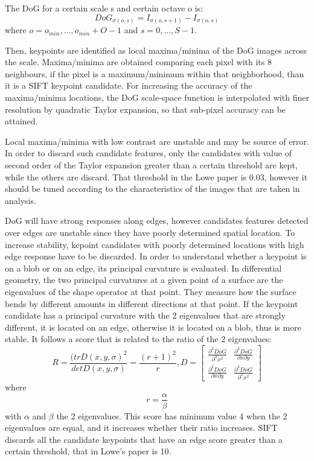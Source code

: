 \documentclass[aps,letterpaper,10pt]{revtex4}
\begin{document}
The DoG for a certain scale s and certain octave o is:
\begin{equation} 
DoG_{\sigma(o,s)} = I_{\sigma(o,s+1)} - I_{\sigma(o,s)}
\end{equation} 
where $o=o_{min},...,o_{min}+O-1$ and $s = 0,...,S-1$.

Then, keypoints are identified as local maxima/minima of the DoG images across the scale. Maxima/minima are obtained comparing each pixel with its 8 neighbours, if the pixel is a maximum/minimum within that neighborhood, than it is a SIFT keypoint candidate. For increasing the accuracy of the maxima/minima locations, the DoG scale-space function is interpolated with finer resolution by quadratic Taylor expansion, so that sub-pixel accuracy can be attained. 

Local maxima/minima with low contrast are unstable and may be source of error. In order to discard such candidate features, only the candidates with value of second order of the Taylor expansion greater than a certain threshold are kept, while the others are discard. That threshold in the Lowe paper is 0.03, however it should be tuned according to the characteristics of the images that are taken in analysis. 

DoG will have strong responses along edges, however candidates features detected over edges are unstable since they have poorly determined spatial location. To increase stability, kepoint candidates with poorly determined locations with high edge response have to be discarded. In order to understand whether a keypoint is on a blob or on an edge, its principal curvature is evaluated. In differential geometry, the two principal curvatures at a given point of a surface are the eigenvalues of the shape operator at that point. They measure how the surface bends by different amounts in different directions at that point. If the keypoint candidate has a principal curvature with the 2 eigenvalues that are strongly different, it is located on an edge, otherwise it is located on a blob, thus is more stable. It follows a score that is related to the ratio of the 2 eigenvalues:
\begin{equation}
R = \frac{(tr D(x,y,\sigma)^2}{det D(x,y,\sigma)} = \frac{(r+1)^2}{r} ,
D = \begin{bmatrix}
\frac{\partial^2{DoG}}{\partial^2{x^2}} & \frac{\partial^2{DoG}}{\partial{x}\partial{y}} \\
\frac{\partial^2{DoG}}{\partial{x}\partial{y}} & \frac{\partial^2{DoG}}{\partial^2{x^2}} 
\end{bmatrix}
\end{equation}
where
\begin{equation}
r = \frac{\alpha}{\beta}
\end{equation}
with $\alpha$ and $\beta$ the 2 eigenvalues.
This score has minimum value 4 when the 2 eigenvalues are equal, and it increases whether their ratio increases. SIFT discards all the candidate keypoints that have an edge score greater than a certain threshold, that in Lowe's paper is 10.
\end{document}

